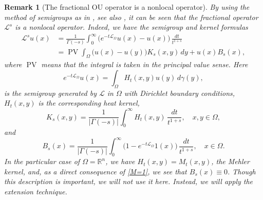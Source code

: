 \documentclass[a4paper,10pt,reqno]{amsart}
\newcommand{\R}{\mathbb{R}}
\newtheorem{remark}[theorem]{Remark}
\numberwithin{equation}{section}
\begin{document}
\begin{remark}[The fractional OU operator is a nonlocal operator]
By using the method of semigroups as in \cite{Stinga-Torrea}, see also
\cite{Caffarelli-Stinga, StingaVolz, Stinga-Zhang}, it can be seen that the fractional
operator $\mathcal{L}^s$ is a nonlocal operator. Indeed, we have the semigroup and kernel formulas
\begin{align*}
\mathcal{L}^su(x) &=\frac{1}{\Gamma(-s)}\int_0^\infty\big(e^{-t\mathcal{L}_\Omega}u(x)
-u(x)\big)\,\frac{dt}{t^{1+s}} \\
&=\operatorname{PV}\int_{\Omega}\big(u(x)-u(y)\big)K_s(x,y)\,dy+u(x)B_s(x),
\end{align*}
where $\operatorname{PV}$ means that the integral is taken in the principal value sense. Here
$$e^{-t\mathcal{L}_\Omega}u(x)=\int_\Omega H_t(x,y)u(y)\,d\gamma(y),$$
is the semigroup generated by $\mathcal{L}$ in $\Omega$ with Dirichlet boundary conditions,
$H_t(x,y)$ is the corresponding heat kernel,
$$K_s(x,y)=\frac{1}{|\Gamma(-s)|}\int_0^\infty H_t(x,y)\,\frac{dt}{t^{1+s}},\quad x,y\in\Omega,$$
and
$$B_s(x)=\frac{1}{|\Gamma(-s)|}\int_0^\infty\big(1-e^{-t\mathcal{L}_\Omega}1(x)\big)\,\frac{dt}{t^{1+s}},
\quad x\in\Omega.$$
In the particular case of $\Omega=\R^n$, we have $H_t(x,y)=M_t(x,y)$, the Mehler kernel, and,
as a direct consequence of \eqref{M=1}, we see that $B_s(x)\equiv0$. Though this description
is important, we will not use it here. Instead, we will apply the extension technique.
\end{remark}
\end{document}
